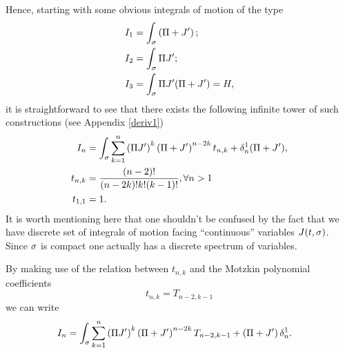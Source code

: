 \documentclass[12pt]{article}%
\numberwithin{equation}{section}
\begin{document}
Hence, starting with some obvious integrals of motion of the type
\begin{equation}
 \label{5}
\begin{split}
 &I_1=\int_\sigma\left(\Pi+J'\right);\\
 &I_2=\int_\sigma\Pi J';\\
 &I_3=\int_\sigma \Pi J'(\Pi+J')=H,
\end{split}
\end{equation}
it is straightforward to see that there exists the following infinite tower of such constructions (see Appendix \ref{deriv1})
\begin{equation}
\label{6}
\begin{aligned}
 I_{n}&=\int_\sigma\sum_{k=1}^{n}\left(\Pi J'\right)^{k}\left(\Pi+J'\right)^{n-2k}t_{n,k}+\delta_n^1 (\Pi+J'),\\
 t_{n,k}&=\frac{(n-2)!}{(n-2k)!k!(k-1)!}, \forall n>1\\
 t_{1,1}&=1.
 \end{aligned}
\end{equation}
It is worth mentioning here that one shouldn't be confused by the fact that we have discrete set of integrals of motion facing ``continuous'' variables $J(t,\sigma)$. Since $\sigma$ is compact one actually has a discrete spectrum of variables. 

By making use of the relation between $t_{n,k}$ and the Motzkin polynomial coefficients
\begin{equation}
t_{n,k}=T_{n-2,k-1}
\end{equation}
we can write
\begin{equation}
\begin{aligned}
I_n&=\int_\sigma\sum_{k=1}^n\left(\Pi J'\right)^{k}\left(\Pi+J'\right)^{n-2k}T_{n-2,k-1}+\left(\Pi+J'\right) \delta_{n}^1.
\end{aligned}
\end{equation}
\end{document}
